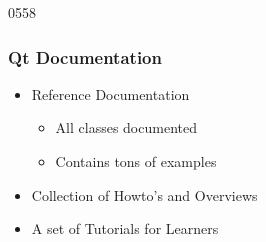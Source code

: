 \begin{slide}{0558} \frametitle{Qt Documentation} 
  \begin{itemize}
    \item Reference Documentation
    \begin{itemize}
      \item All classes documented
      \item Contains tons of examples
    \end{itemize}
    \item Collection of Howto's and Overviews
    \item A set of Tutorials for Learners
  \end{itemize}
  \vspace{5mm}
\end{slide}

